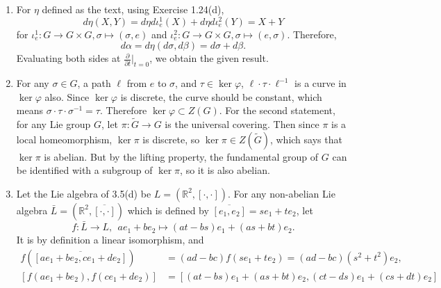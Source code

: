 \begin{enumerate}
\[=\begin{pmatrix}-1 & -\frac{a}{c} \\ \\ 0 & -2\end{pmatrix}.\]
Therefore, the diagonal elements of $e^{LAL^{-1}}$ should be $-2$ and $-1$. 
Meanwhile, if we let $\lambda_{1}, \lambda_{2}$ be the eigenvalues of $A$ (and $LAL^{-1}$), since $A$ is real, two eigenvalues are either both real or complex conjugates. 
But since $LAL^{-1}$ is upper triangular, the diagonal elements of $e^{LAL^{-1}}$ are $e^{\lambda_{1}}$ and $e^{\lambda_{2}}$, which should not be $-2$ and $-1$ in either case. 
Therefore, there is no $A$ satisfying the condition.
\item For $\eta$ defined as the text, using Exercise 1.24(d),
\[d \eta(X, Y)=d \eta d \iota_{e}^{1}(X)+d \eta d \iota_{e}^{2}(Y)=X+Y\]
for $\iota_{e}^{1}\colon G \rightarrow G \times G, \sigma \mapsto(\sigma, e)$ 
and $\iota_{e}^{2}\colon G \rightarrow G \times G, \sigma \mapsto(e, \sigma)$. 
Therefore,
\[d \alpha=d \eta(d \sigma, d \beta)=d \sigma+d \beta.\]
Evaluating both sides at $\frac{\partial}{\partial t}\big|_{t=0}$, we obtain the given result.
\item For any $\sigma \in G$, a path $\ell$ from $e$ to $\sigma$, and $\tau \in \ker \varphi$, 
$\ell \cdot \tau \cdot \ell^{-1}$ is a curve in $\ker \varphi$ also. 
Since $\ker \varphi$ is discrete, the curve should be constant, 
which means $\sigma \cdot \tau \cdot \sigma^{-1}=\tau$. 
Therefore $\ker \varphi \subset Z(G)$.
For the second statement, for any Lie group $G$, let $\pi\colon \tilde{G} \rightarrow G$ is the universal covering. 
Then since $\pi$ is a local homeomorphism, $\ker \pi$ is discrete, 
so $\ker \pi \in Z(\tilde{G})$, which says that $\ker \pi$ is abelian. 
But by the lifting property, the fundamental group of $G$ can be identified with a subgroup of $\ker \pi$, so it is also abelian.
\item Let the Lie algebra of 3.5(d) be $L=(\mathbb{R}^{2},[\cdot, \cdot])$. 
For any non-abelian Lie algebra $\bar{L}=(\mathbb{R}^{2}, \overline{[\cdot, \cdot]})$ 
which is defined by $\overline{[e_{1}, e_{2}]}=se_{1}+te_{2}$, let
\[f\colon \bar{L} \rightarrow L,\ \ ae_{1}+be_{2} \mapsto (at-bs) e_{1}+(as+bt) e_{2}.\] 
It is by definition a linear isomorphism, and
\begin{align*}
f(\overline{[ae_{1}+be_{2}, ce_{1}+de_{2}]})
&=(ad-bc) f(se_{1}+te_{2})=(ad-bc)(s^{2}+t^{2}) e_{2},\\
[f(ae_{1}+be_{2}), f(ce_{1}+de_{2})]
&=[(at-bs) e_{1}+(as+bt) e_{2},(ct-ds) e_{1}+(cs+dt) e_{2}]\\

\end{align*}
\end{enumerate}
